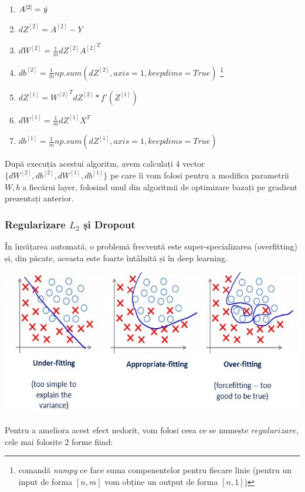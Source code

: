 \begin{enumerate}
\item $A^{[2]}=\textit{\^{y}}$
\item $dZ^{[2]}=A^{[2]}-Y$
\item $\displaystyle{dW^{[2]} = \frac{1}{m}dZ^{[2]}{A^{[2]}}^T}$
\item $\displaystyle{db^{[2]} = \frac{1}{m}} np.sum(dZ^{[2]}, axis=1, keepdims=True)$ \footnote{comandă \textit{numpy} ce face suma compenentelor pentru fiecare linie (pentru un input de forma $[n,m]$ vom obține un output de forma $[n,1]$)}
\item $dZ^{[1]}={W^{[2]}}^TdZ^{[2]} * f'(Z^{[1]})$
\item $\displaystyle{dW^{[1]} = \frac{1}{m} dZ^{[1]}X^T}$
\item $\displaystyle{db^{[1]} = \frac{1}{m}} np.sum(dZ^{[1]}, axis=1, keepdims=True)$
\end{enumerate}

După execuția acestui algoritm, avem calculați 4 vector $\{dW^{[2]},db^{[2]},dW^{[1]},db^{[1]}\}$ pe care îi vom folosi pentru a modifica parametrii $W,b$ a fiecărui layer, folosind unul din algoritmii de optimizare bazați pe gradient prezentați anterior. \cite{deeplearningAI}

\subsubsection{Regularizare $L_2$ și Dropout}
În învățarea automată, o problemă frecventă este super-specializarea (overfitting) și, din păcate, aceasta este foarte întâlnită și în deep learning.

\begin{center}
\includegraphics[scale=0.7]{fittings}
\end{center}

Pentru a ameliora acest efect nedorit, vom folosi ceea ce se numește $regularizare$, cele mai folosite 2 forme fiind:

